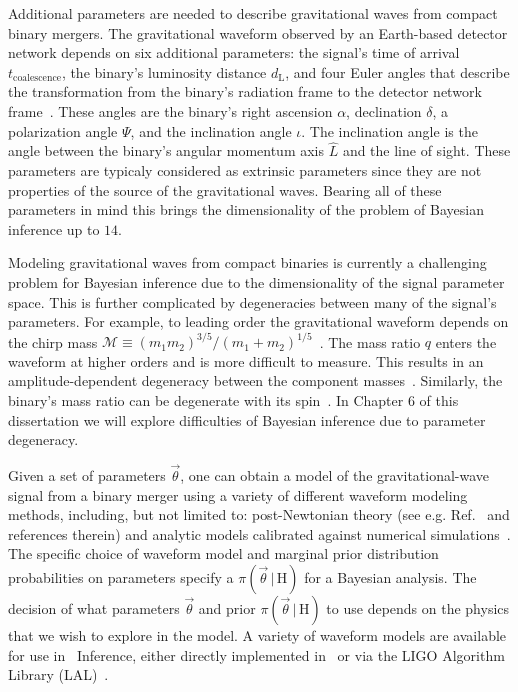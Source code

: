 Additional parameters are needed to describe gravitational waves from compact binary mergers.
The gravitational waveform observed by an 
Earth-based detector network depends on six additional parameters: the
signal's time of arrival $t_\mathrm{coalescence}$, the binary's luminosity distance
$d_\mathrm{L}$, and four Euler angles that describe the transformation from the
binary's radiation frame to the detector network frame~\cite{Wahlquist:1987rx}.  These
angles are the binary's right ascension $\alpha$,
declination $\delta$, a polarization angle $\Psi$, and the inclination angle
$\iota$. The inclination angle is the angle between the binary's angular momentum axis $\hat{L}$ 
and the line of
sight. These parameters are typicaly considered as extrinsic parameters since they
are not properties of the source of the gravitational waves. Bearing all of these
parameters in mind this brings the dimensionality of the problem of Bayesian inference
up to $14$.

Modeling gravitational waves from compact binaries is
currently a challenging problem for Bayesian inference due to the dimensionality
of the signal parameter space.
This is further
complicated by degeneracies between many of the signal's parameters. For example, to
leading order the gravitational waveform depends on the chirp mass
$\mathcal{M} \equiv (m_1 m_2)^{3/5} / (m_1 + m_2)^{1/5}$~\cite{Peters:1963ux}.
The mass ratio $q$ enters the waveform at
higher orders and is more difficult to measure. This results in an
amplitude-dependent degeneracy between the component
masses~\cite{Christensen:2001cr}. Similarly, the binary's mass ratio can be
degenerate with its spin~\cite{Hannam:2013uu}. In Chapter 6 of this dissertation
we will explore difficulties of Bayesian inference due to parameter degeneracy.

Given a set of parameters $\vec{\theta}$, one can obtain a model of the
gravitational-wave signal from a binary merger using a variety of different
waveform modeling methods, including, but not limited to:
post-Newtonian theory (see e.g. Ref.~\cite{Blanchet2006}
and references therein) and analytic models calibrated against numerical
simulations~\cite{Buonanno:1998gg,Buonanno:2000ef,Damour:2000we,Damour:2001tu,Ajith:2007qp,Ajith:2009bn,Santamaria:2010yb}.
The specific choice of waveform model and marginal prior distribution probabilities
on parameters specify a $\pi(\vec{\theta} \, | \, \mathrm{H})$ for a Bayesian analysis.
The decision of what parameters $\vec{\theta}$ and prior $\pi(\vec{\theta} \, | \, \mathrm{H})$ 
to use depends on the
physics that we wish to explore in the model. A variety of waveform models are available
for use in \pycbc{}\ Inference, either directly implemented in \pycbc{}\ or via 
the LIGO Algorithm Library (LAL)~\cite{lal}.

